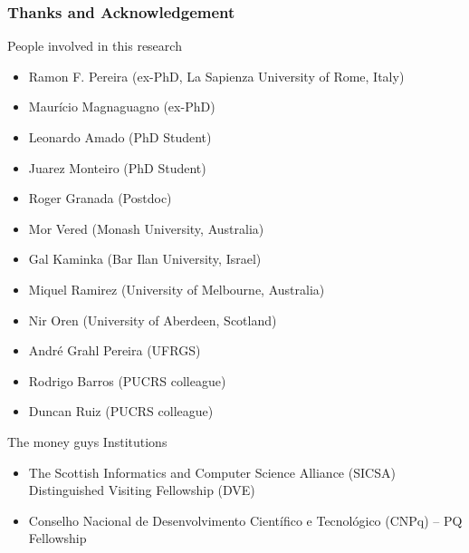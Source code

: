\documentclass[usenames,dvipsnames]{beamer}
\begin{document}
\begin{frame}[c]\frametitle{Thanks and Acknowledgement}
	People involved in this research
	\begin{itemize}
		\item Ramon F. Pereira (ex-PhD, La Sapienza University of Rome, Italy)
		\item Maurício Magnaguagno (ex-PhD)
		\item Leonardo Amado (PhD Student)
		\item Juarez Monteiro (PhD Student)
		\item Roger Granada (Postdoc)
		\item Mor Vered (Monash University, Australia)
		\item Gal Kaminka (Bar Ilan University, Israel)
		\item Miquel Ramirez (University of Melbourne, Australia) 
		\item Nir Oren (University of Aberdeen, Scotland)
		\item André Grahl Pereira (UFRGS)
		\item Rodrigo Barros (PUCRS colleague) 
		\item Duncan Ruiz (PUCRS colleague) 
	\end{itemize}
\end{frame}

\begin{frame}[c]{The money guys}
	Institutions
	\begin{itemize}
		\item The Scottish Informatics and Computer Science Alliance (SICSA) \\ Distinguished Visiting Fellowship (DVE)
		\item Conselho Nacional de Desenvolvimento Científico e Tecnológico (CNPq) -- PQ Fellowship
	\end{itemize}
\end{frame}
\end{document}

